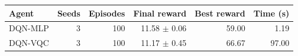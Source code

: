 \begin{tabular}{lrrrrr}
\hline
Agent & Seeds & Episodes & Final reward & Best reward & Time (s) \\
\hline
DQN-MLP & 3 & 100 & 11.58 $\pm$ 0.06 & 59.00 & 1.19 \\
DQN-VQC & 3 & 100 & 11.17 $\pm$ 0.45 & 66.67 & 97.00 \\
\hline
\end{tabular}
